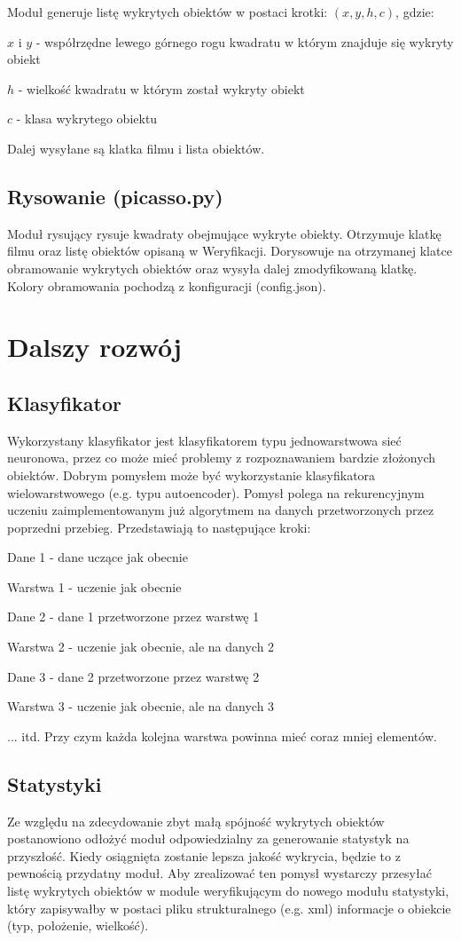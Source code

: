 \documentclass[10pt,a4paper]{article}
\begin{document}
Moduł generuje listę wykrytych obiektów w postaci krotki: $(x, y, h, c)$,
gdzie:

$x$ i $y$ - współrzędne lewego górnego rogu kwadratu w którym znajduje się wykryty obiekt

$h$ - wielkość kwadratu w którym został wykryty obiekt

$c$ - klasa wykrytego obiektu

Dalej wysyłane są klatka filmu i lista obiektów.

\subsection{Rysowanie (picasso.py)}

Moduł rysujący rysuje kwadraty obejmujące wykryte obiekty. Otrzymuje klatkę filmu oraz listę obiektów opisaną w Weryfikacji. Dorysowuje na otrzymanej klatce obramowanie wykrytych obiektów oraz wysyła dalej zmodyfikowaną klatkę. Kolory obramowania pochodzą z konfiguracji (config.json).

\section{Dalszy rozwój}

\subsection{Klasyfikator}
Wykorzystany klasyfikator jest klasyfikatorem typu jednowarstwowa sieć neuronowa, przez co może mieć problemy z rozpoznawaniem bardzie złożonych obiektów. Dobrym pomysłem może być wykorzystanie klasyfikatora wielowarstwowego (e.g. typu autoencoder). Pomysł polega na rekurencyjnym uczeniu zaimplementowanym już algorytmem na danych przetworzonych przez poprzedni przebieg. Przedstawiają to następujące kroki:

Dane 1 - dane uczące jak obecnie

Warstwa 1 - uczenie jak obecnie

Dane 2 - dane 1 przetworzone przez warstwę 1

Warstwa 2 - uczenie jak obecnie, ale na danych 2

Dane 3 - dane 2 przetworzone przez warstwę 2

Warstwa 3 - uczenie jak obecnie, ale na danych 3

... itd. Przy czym każda kolejna warstwa powinna mieć coraz mniej elementów.
 

\subsection{Statystyki}
Ze względu na zdecydowanie zbyt małą spójność wykrytych obiektów postanowiono odłożyć moduł odpowiedzialny za generowanie statystyk na przyszłość. Kiedy osiągnięta zostanie lepsza jakość wykrycia, będzie to z pewnością przydatny moduł. Aby zrealizować ten pomysł wystarczy przesyłać listę wykrytych obiektów w module weryfikującym do nowego modułu statystyki, który zapisywałby w postaci pliku strukturalnego (e.g. xml) informacje o obiekcie (typ, położenie, wielkość).
\end{document}
